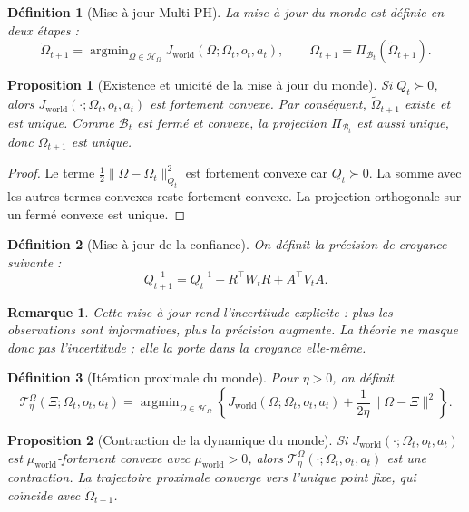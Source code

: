 \documentclass[11pt,a4paper]{article}
\newtheorem{definition}{Définition}[section]
\newtheorem{proposition}{Proposition}[section]
\newtheorem{remark}{Remarque}[section]
\DeclareMathOperator{\argmin}{argmin}
\newcommand{\Hh}{\mathcal H}
\newcommand{\1}{\mathbf 1}
\begin{document}
\begin{definition}[Mise à jour Multi-PH]
La mise à jour du monde est définie en deux étapes :
\[
\tilde\Omega_{t+1}
=
\argmin_{\Omega\in\Hh_\Omega}
J_{\mathrm{world}}(\Omega;\Omega_t,o_t,a_t),
\qquad
\Omega_{t+1}
=
\Pi_{\mathcal B_t}(\tilde\Omega_{t+1}).
\]
\end{definition}

\begin{proposition}[Existence et unicité de la mise à jour du monde]
Si \(Q_t\succ 0\), alors \(J_{\mathrm{world}}(\cdot;\Omega_t,o_t,a_t)\) est fortement convexe.  
Par conséquent, \(\tilde\Omega_{t+1}\) existe et est unique.  
Comme \(\mathcal B_t\) est fermé et convexe, la projection \(\Pi_{\mathcal B_t}\) est aussi unique, donc \(\Omega_{t+1}\) est unique.
\end{proposition}

\begin{proof}
Le terme \(\frac12\|\Omega-\Omega_t\|_{Q_t}^2\) est fortement convexe car \(Q_t\succ 0\).  
La somme avec les autres termes convexes reste fortement convexe.  
La projection orthogonale sur un fermé convexe est unique.
\end{proof}

\begin{definition}[Mise à jour de la confiance]
On définit la précision de croyance suivante :
\[
Q_{t+1}^{-1}
=
Q_t^{-1}
+
R^\top W_t R
+
A^\top V_t A.
\]
\end{definition}

\begin{remark}
Cette mise à jour rend l'incertitude explicite : plus les observations sont informatives, plus la précision augmente.  
La théorie ne masque donc pas l'incertitude ; elle la porte dans la croyance elle-même.
\end{remark}

\begin{definition}[Itération proximale du monde]
Pour \(\eta>0\), on définit
\[
\mathcal T^\Omega_\eta(\Xi;\Omega_t,o_t,a_t)
=
\argmin_{\Omega\in\Hh_\Omega}
\left\{
J_{\mathrm{world}}(\Omega;\Omega_t,o_t,a_t)
+
\frac{1}{2\eta}\|\Omega-\Xi\|^2
\right\}.
\]
\end{definition}

\begin{proposition}[Contraction de la dynamique du monde]
Si \(J_{\mathrm{world}}(\cdot;\Omega_t,o_t,a_t)\) est \(\mu_{\mathrm{world}}\)-fortement convexe avec \(\mu_{\mathrm{world}}>0\), alors \(\mathcal T^\Omega_\eta(\cdot;\Omega_t,o_t,a_t)\) est une contraction.  
La trajectoire proximale converge vers l'unique point fixe, qui coïncide avec \(\tilde\Omega_{t+1}\).
\end{proposition}
\end{document}
